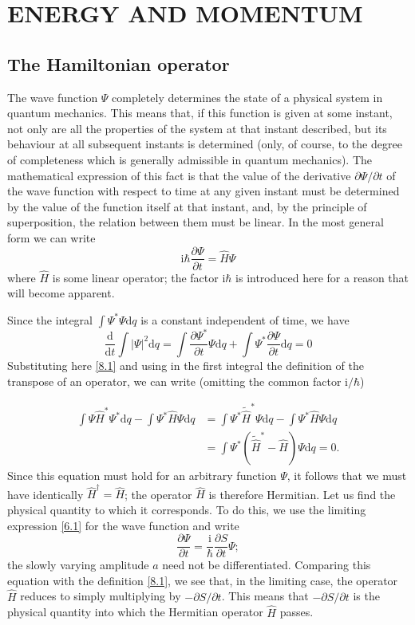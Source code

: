 \chapter{ENERGY AND MOMENTUM}
\section{The Hamiltonian operator}\label{The Hamiltonian operator}

The wave function $ \Psi $ completely determines the state of a physical system in quantum mechanics. This means that, if this function is given at some instant, not only are all the properties of the system at that instant described, but its behaviour at all subsequent instants is determined (only, of course, to the degree of completeness which is generally admissible in quantum mechanics). The mathematical expression of this fact is that the value of the derivative $ \partial\Psi/\partial t $ of the wave function with respect to time at any given instant must be determined by the value of the function itself at that instant, and, by the principle of superposition, the relation between them must be linear. In the most general form we can write
\begin{equation}\label{8.1}
\mathrm{i}\hbar\frac{\partial\Psi}{\partial t}=\hat{H}\Psi
\end{equation}
where $ \hat{H} $ is some linear operator; the factor $ \mathrm{i}\hbar $ is introduced here for a reason that will become apparent.

Since the integral $ \int\Psi^*\Psi\mathrm{d}q $ is a constant independent of time, we have
\[ \frac{\mathrm{d}}{\mathrm{d}t}\int|\Psi|^2\mathrm{d}q=\int\frac{\partial\Psi^*}{\partial t}\Psi\mathrm{d}q+\int\Psi^*\frac{\partial\Psi}{\partial t}\mathrm{d}q=0 \]
Substituting here \eqref{8.1} and using in the first integral the definition of the transpose of an operator, we can write (omitting the common factor $ \mathrm{i}/\hbar $)

\begin{align*}
\int\Psi\hat{H}^*\Psi^*\mathrm{d}q-\int\Psi^*\hat{H}\Psi\mathrm{d}q&=\int\Psi^*\tilde{\hat{H}}^*\Psi\mathrm{d}q-\int\Psi^*\hat{H}\Psi\mathrm{d}q\\
&=\int\Psi^*\left(\tilde{\hat{H}}^*-\hat{H} \right)\Psi\mathrm{d}q=0.
\end{align*}
Since this equation must hold for an arbitrary function $ \Psi $, it follows that we must have identically $ \hat{H}^\dag=\hat{H} $; the operator $ \hat{H} $ is therefore Hermitian. Let us find the physical quantity to which it corresponds. To do this, we use the limiting expression \eqref{6.1} for the wave function and write
\[ \frac{\partial\Psi}{\partial t}=\frac{\mathrm{i}}{\hbar}\frac{\partial S}{\partial t}\Psi; \]
the slowly varying amplitude $ a $ need not be differentiated. Comparing this equation with the definition \eqref{8.1}, we see that, in the limiting case, the operator $ \hat{H} $ reduces to simply multiplying by $ -\partial S/\partial t $. This means that $ -{\partial S}/{\partial t} $ is the physical quantity into which the Hermitian operator $ \hat{H} $ passes.

